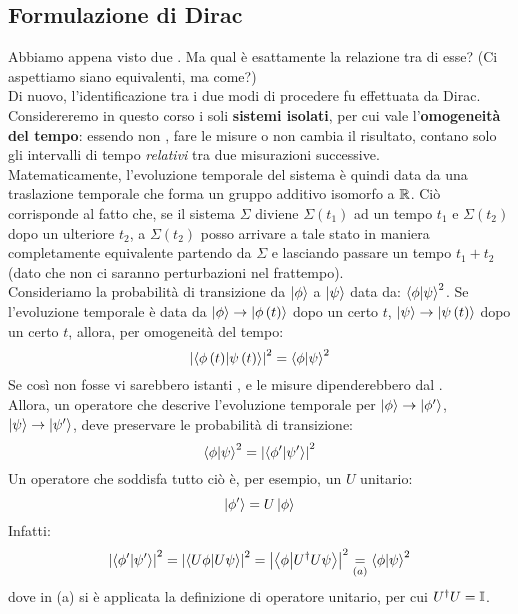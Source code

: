 \documentclass[../../FisicaTeorica.tex]{subfiles}
\begin{document}
\subsection{Formulazione di Dirac}
Abbiamo appena visto due . Ma qual è esattamente la relazione tra di esse? (Ci aspettiamo siano equivalenti, ma come?)\\
Di nuovo, l'identificazione tra i due modi di procedere fu effettuata da Dirac.\\
Considereremo in questo corso i soli \textbf{sistemi isolati}, per cui vale l'\textbf{omogeneità del tempo}: essendo non , fare le misure  o  non cambia il risultato, contano solo gli intervalli di tempo \textit{relativi} tra due misurazioni successive.\\ Matematicamente, l'evoluzione temporale del sistema è quindi data da una traslazione temporale che forma un gruppo additivo isomorfo a $\mathbb{R}$.
Ciò corrisponde al fatto che, se il sistema $\Sigma$ diviene $\Sigma\left(t_1\right)$ ad un tempo $t_1$ e $\Sigma\left(t_2\right)$ dopo un ulteriore $t_2$, a $\Sigma\left(t_2\right)$ posso arrivare a tale stato  in maniera completamente equivalente partendo da $\Sigma$ e lasciando passare un tempo $t_1+t_2$ (dato che non ci saranno perturbazioni nel frattempo).\\

Consideriamo la probabilità di transizione da $\ket{\phi}$ a $\ket{\psi}$ data da: $\braket{\phi|\psi}^2$. 
Se l'evoluzione temporale è data da $\ket{\phi}\to \ket{\phi \left(t\right)}$ dopo un certo $t$, $\ket{\psi}\to \ket{\psi\left(t\right)}$ dopo un certo $t$, allora, per omogeneità del tempo:
\[
\left|\left\langle\phi\left(t\right)\middle|\psi\left(t\right)\right\rangle\right|^2=\braket{\phi|\psi}^2
\]
Se così non fosse vi sarebbero istanti , e le misure dipenderebbero dal .\\

Allora, un operatore che descrive l'evoluzione temporale per $\ket{\phi}\to |\phi^\prime\rangle$, $\ket{\psi}\to |\psi^\prime\rangle$, deve preservare le probabilità di transizione:
\[
\braket{\phi|\psi}^2=\left|\left\langle\phi^\prime\middle|\psi^\prime\right\rangle\right|^2
\]
Un operatore che soddisfa tutto ciò è, per esempio, un $U$ unitario:
\[
\left|\phi^\prime\right\rangle=U\ket{\phi}
\]
Infatti:
\begin{equation}
\left|\left\langle\phi^\prime\middle|\psi^\prime\right\rangle\right|^2=\left|\left\langle U\phi\middle| U\psi\right\rangle\right|^2=\left|\left\langle\phi\middle| U^\dag U\psi\right\rangle\right|^2\underset{(a)}{=}\braket{\phi|\psi}^2
\label{eqn:prob-unitario}
\end{equation}
dove in (a) si è applicata la definizione di operatore unitario, per cui $U^\dag U=\mathbb{I}$.\\
\end{document}
